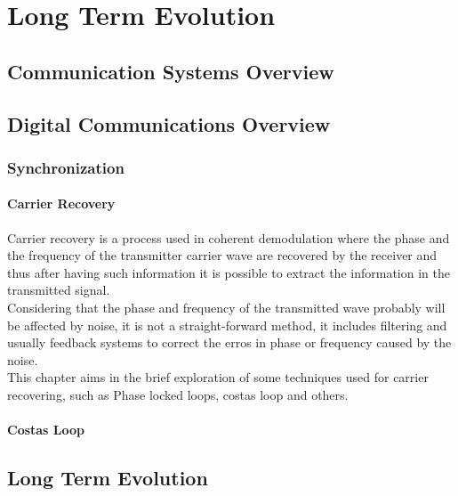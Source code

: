 \chapter{Long Term Evolution}

\section{Communication Systems Overview}

\section{Digital Communications Overview}
\label{sec:digitalcomm}

\subsection{Synchronization}

\subsubsection{Carrier Recovery}

Carrier recovery is a process used in coherent demodulation where the phase
and the frequency of the transmitter carrier wave are recovered by the receiver
and thus after having such information it is possible to extract the information
in the transmitted signal.\\
Considering that the phase and frequency of the transmitted wave probably will
be affected by noise, it is not a straight-forward method, it includes filtering
and usually feedback systems to correct the erros in phase or frequency caused
by the noise.\\
This chapter aims in the brief exploration of some techniques used for carrier
recovering, such as Phase locked loops, costas loop and others.\\

\subsubsection{Costas Loop}


\section{Long Term Evolution}
